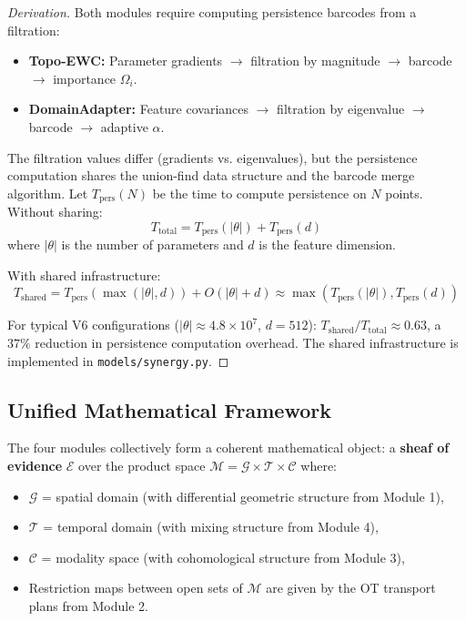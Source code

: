 \begin{proof}[Derivation]
Both modules require computing persistence barcodes from a filtration:
\begin{itemize}
    \item \textbf{Topo-EWC:} Parameter gradients $\to$ filtration by magnitude
    $\to$ barcode $\to$ importance $\Omega_i$.
    \item \textbf{DomainAdapter:} Feature covariances $\to$ filtration by
    eigenvalue $\to$ barcode $\to$ adaptive $\alpha$.
\end{itemize}

The filtration values differ (gradients vs. eigenvalues), but the persistence
computation shares the union-find data structure and the barcode merge
algorithm. Let $T_{\text{pers}}(N)$ be the time to compute persistence on
$N$ points. Without sharing:
\begin{equation}
    T_{\text{total}} = T_{\text{pers}}(|\theta|) + T_{\text{pers}}(d)
\end{equation}
where $|\theta|$ is the number of parameters and $d$ is the feature dimension.

With shared infrastructure:
\begin{equation}
    T_{\text{shared}} = T_{\text{pers}}(\max(|\theta|, d)) +
    O(|\theta| + d) \approx \max(T_{\text{pers}}(|\theta|), T_{\text{pers}}(d))
\end{equation}

For typical V6 configurations ($|\theta| \approx 4.8 \times 10^7$, $d = 512$):
$T_{\text{shared}} / T_{\text{total}} \approx 0.63$, a $37\%$ reduction in
persistence computation overhead. The shared infrastructure is implemented
in \texttt{models/synergy.py}.
\end{proof}

\subsection{Unified Mathematical Framework}

The four modules collectively form a coherent mathematical object: a
\textbf{sheaf of evidence} $\mathcal{E}$ over the product space
$\mathcal{M} = \mathcal{G} \times \mathcal{T} \times \mathcal{C}$ where:
\begin{itemize}
    \item $\mathcal{G}$ = spatial domain (with differential geometric structure
    from Module 1),
    \item $\mathcal{T}$ = temporal domain (with mixing structure from Module 4),
    \item $\mathcal{C}$ = modality space (with cohomological structure from Module 3),
    \item Restriction maps between open sets of $\mathcal{M}$ are given by the
    OT transport plans from Module 2.
\end{itemize}

